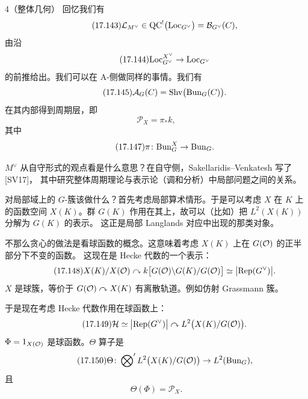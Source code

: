 \begin{srcconj}{4}（整体几何）
回忆我们有
\begin{equation}\tag{17.143}\label{eq:17.143}
\mathcal{L}_{M^{\vee}}\in\mathrm{QC}^{!}\bigl(\mathrm{Loc}_{G^{\vee}}\bigr)=\mathcal B_{G^{\vee}}(C),
\end{equation}
由沿
\begin{equation}\tag{17.144}\label{eq:17.144}
\mathrm{Loc}^{X^{\vee}}_{G^{\vee}}\to\mathrm{Loc}_{G^{\vee}}
\end{equation}
的前推给出。我们可以在 A-侧做同样的事情。我们有
\begin{equation}\tag{17.145}\label{eq:17.145}
\mathcal A_G(C)=\mathrm{Shv}\bigl(\mathrm{Bun}_G(C)\bigr).
\end{equation}
在其内部得到周期层，即
\begin{equation}\tag{17.146}\label{eq:17.146}
\mathcal{P}_X=\pi_*k,
\end{equation}
其中
\begin{equation}\tag{17.147}\label{eq:17.147}
\pi\colon\mathrm{Bun}^X_G\to\mathrm{Bun}_G.
\end{equation}
\end{srcconj}

$M^{\vee}$ 从自守形式的观点看是什么意思？在自守侧，Sakellaridis--Venkatesh 写了 [SV17]，
其中研究整体周期理论与表示论（调和分析）中局部问题之间的关系。

对局部域上的 $G$-簇该做什么？首先考虑局部算术情形。于是可以考虑 $X$ 在 $K$ 上的函数空间
$X(K)$。群 $G(K)$ 作用在其上，故可以（比如）把 $L^2(X(K))$ 分解为 $G(K)$ 的表示。
这正是局部 Langlands 对应中出现的那类对象。

不那么贪心的做法是看球函数的概念。这意味着考虑 $X(K)$ 上在 $G(\mathcal{O})$ 的正半部分下不变的函数。
这现在是 Hecke 代数的一个表示：
\begin{equation}\tag{17.148}\label{eq:17.148}
X(K)/X(\mathcal{O})\curvearrowright k\bigl[G(\mathcal{O})\backslash G(K)/G(\mathcal{O})\bigr]
\simeq\bigl|\mathrm{Rep}(G^{\vee})\bigr|.
\end{equation}
$X$ 是球簇，等价于 $G(\mathcal{O})\curvearrowright X(K)$ 有离散轨道。例如仿射 Grassmann 簇。

于是现在考虑 Hecke 代数作用在球函数上：
\begin{equation}\tag{17.149}\label{eq:17.149}
\mathcal{H}\simeq\bigl|\mathrm{Rep}(G^{\vee})\bigr|\curvearrowright L^2\bigl(X(K)/G(\mathcal{O})\bigr).
\end{equation}
$\Phi=1_{X(\mathcal{O})}$ 是球函数。$\Theta$ 算子是
\begin{equation}\tag{17.150}\label{eq:17.150}
\Theta\colon\sideset{}{'}\bigotimes L^2\bigl(X(K)/G(\mathcal{O})\bigr)\to L^2(\mathrm{Bun}_G),
\end{equation}
且
\begin{equation}\tag{17.151}\label{eq:17.151}
\Theta(\Phi)=\mathcal{P}_X.
\end{equation}

